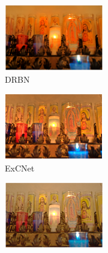 \documentclass[letterpaper,12pt]{article}
\begin{document}
\begin{figure}[htbp]
\begin{subfigure}{0.18\textwidth}
			\includegraphics[width=\linewidth]{MIT-Adobe_FiveK/DRBN}
			\captionsetup{font=scriptsize}
			\caption{DRBN}
			\label{fig: MIT-Adobe_FiveK_k}  
		\end{subfigure}    
		\begin{subfigure}{0.18\textwidth}
			\includegraphics[width=\linewidth]{MIT-Adobe_FiveK/ExCNet}
			\captionsetup{font=scriptsize}
			\caption{ExCNet}
			\label{fig: MIT-Adobe_FiveK_l}
		\end{subfigure}
		\begin{subfigure}{0.18\textwidth}
			\includegraphics[width=\linewidth]{MIT-Adobe_FiveK/Zero-DCE}

\end{subfigure}
\end{figure}
\end{document}
